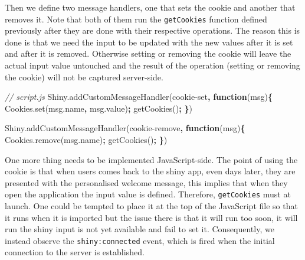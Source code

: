 \documentclass[
]{krantz}
\makeatletter
\newenvironment{Shaded}{\begin{snugshade}}{\end{snugshade}}
\newcommand{\AttributeTok}[1]{\textcolor[rgb]{0.61,0.61,0.61}{#1}}
\newcommand{\CommentTok}[1]{\textcolor[rgb]{0.37,0.37,0.37}{\textit{#1}}}
\newcommand{\KeywordTok}[1]{\textcolor[rgb]{0.27,0.27,0.27}{\textbf{#1}}}
\newcommand{\NormalTok}[1]{#1}
\newcommand{\OperatorTok}[1]{\textcolor[rgb]{0.43,0.43,0.43}{\textbf{#1}}}
\newcommand{\StringTok}[1]{\textcolor[rgb]{0.5,0.5,0.5}{#1}}
\newcommand{\VariableTok}[1]{\textcolor[rgb]{0,0,0}{#1}}
\newenvironment{kframe}{%
\medskip{}
\setlength{\fboxsep}{.8em}
 \def\at@end@of@kframe{}%
 \ifinner\ifhmode%
  \def\at@end@of@kframe{\end{minipage}}%
  \begin{minipage}{\columnwidth}%
 \fi\fi%
 \def\FrameCommand##1{\hskip\@totalleftmargin \hskip-\fboxsep
 \colorbox{shadecolor}{##1}\hskip-\fboxsep
     \hskip-\linewidth \hskip-\@totalleftmargin \hskip\columnwidth}%
 \MakeFramed {\advance\hsize-\width
   \@totalleftmargin\z@ \linewidth\hsize
   \@setminipage}}%
 {\par\unskip\endMakeFramed%
 \at@end@of@kframe}
\renewenvironment{Shaded}{\begin{kframe}}{\end{kframe}}
\makeatother
\begin{document}
Then we define two message handlers, one that sets the cookie and another that removes it. Note that both of them run the \texttt{getCookies} function defined previously after they are done with their respective operations. The reason this is done is that we need the input to be updated with the new values after it is set and after it is removed. Otherwise setting or removing the cookie will leave the actual input value untouched and the result of the operation (setting or removing the cookie) will not be captured server-side.

\begin{Shaded}
\begin{Highlighting}[]
\CommentTok{// script.js}
\VariableTok{Shiny}\NormalTok{.}\AttributeTok{addCustomMessageHandler}\NormalTok{(}\StringTok{\textquotesingle{}cookie{-}set\textquotesingle{}}\OperatorTok{,} \KeywordTok{function}\NormalTok{(msg)}\OperatorTok{\{}
  \VariableTok{Cookies}\NormalTok{.}\AttributeTok{set}\NormalTok{(}\VariableTok{msg}\NormalTok{.}\AttributeTok{name}\OperatorTok{,} \VariableTok{msg}\NormalTok{.}\AttributeTok{value}\NormalTok{)}\OperatorTok{;}
  \AttributeTok{getCookies}\NormalTok{()}\OperatorTok{;}
\OperatorTok{\}}\NormalTok{)}

\VariableTok{Shiny}\NormalTok{.}\AttributeTok{addCustomMessageHandler}\NormalTok{(}\StringTok{\textquotesingle{}cookie{-}remove\textquotesingle{}}\OperatorTok{,} \KeywordTok{function}\NormalTok{(msg)}\OperatorTok{\{}
  \VariableTok{Cookies}\NormalTok{.}\AttributeTok{remove}\NormalTok{(}\VariableTok{msg}\NormalTok{.}\AttributeTok{name}\NormalTok{)}\OperatorTok{;}
  \AttributeTok{getCookies}\NormalTok{()}\OperatorTok{;}
\OperatorTok{\}}\NormalTok{)}
\end{Highlighting}
\end{Shaded}

One more thing needs to be implemented JavaScript-side. The point of using the cookie is that when users comes back to the shiny app, even days later, they are presented with the personalised welcome message, this implies that when they open the application the input value is defined. Therefore, \texttt{getCookies} must at launch. One could be tempted to place it at the top of the JavaScript file so that it runs when it is imported but the issue there is that it will run too soon, it will run the shiny input is not yet available and fail to set it. Consequently, we instead observe the \texttt{shiny:connected} event, which is fired when the initial connection to the server is established.
\end{document}
